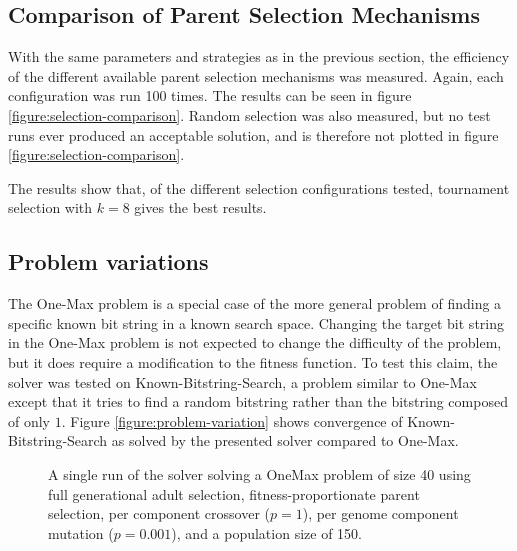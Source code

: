 \documentclass[twocolumn,oneside]{amsart}
\begin{document}
\subsection{Comparison of Parent Selection Mechanisms}

With the same parameters and strategies as in the previous section, the efficiency of the different available parent selection mechanisms was measured.
Again, each configuration was run 100 times.
The results can be seen in figure \ref{figure:selection-comparison}.
Random selection was also measured, but no test runs ever produced an acceptable solution, and is therefore not plotted in figure \ref{figure:selection-comparison}.

The results show that, of the different selection configurations tested, tournament selection with $ k = 8 $ gives the best results.

\subsection{Problem variations}

The One-Max problem is a special case of the more general problem of finding a specific known bit string in a known search space.
Changing the target bit string in the One-Max problem is not expected to change the difficulty of the problem, but it does require a modification to the fitness function.
To test this claim, the solver was tested on Known-Bitstring-Search, a problem similar to One-Max except that it tries to find a random bitstring rather than the bitstring composed of only $ 1 $.
Figure \ref{figure:problem-variation} shows convergence of Known-Bitstring-Search as solved by the presented solver compared to One-Max.

\begin{figure}[H]

\caption{A single run of the solver solving a OneMax problem of size 40 using full generational adult selection, fitness-proportionate parent selection, per component crossover ($ p = 1 $), per genome component mutation ($ p = 0.001 $), and a population size of 150.}
\label{figure:single-run}
\end{figure}

\onecolumn
\end{document}
